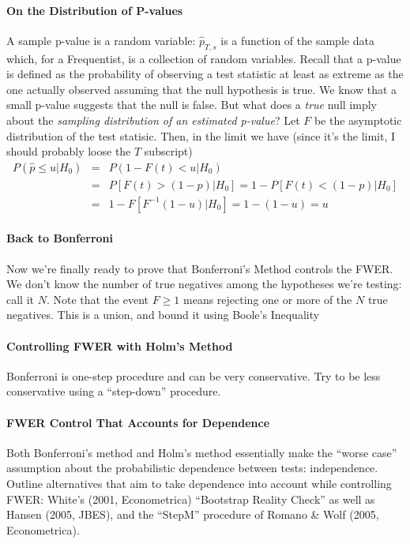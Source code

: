 \paragraph{On the Distribution of P-values}
A sample p-value is a random variable: $\widehat{p}_{T,s}$ is a function of the sample data which, for a Frequentist, is a collection of random variables.
Recall that a p-value is defined as the probability of observing a test statistic at least as extreme as the one actually observed assuming that the null hypothesis is true.
We know that a small p-value suggests that the null is false.
But what does a \emph{true} null imply about the \emph{sampling distribution of an estimated p-value}?
Let $F$ be the asymptotic distribution of the test statisic.
Then, in the limit we have (since it's the limit, I should probably loose the $T$ subscript)
\begin{eqnarray*}
  P(\widehat{p}\leq u|H_0) &=&  P(1- F(t)<u|H_0) \\
  &=& P\left[ F(t) > \left( 1-p \right)|H_0  \right] = 1 - P\left[ F(t) < (1-p) |H_0 \right]\\
  &=& 1 - F\left[ F^{-1}(1-u)|H_0\right] = 1 - (1-u) = u
\end{eqnarray*}

\paragraph{Back to Bonferroni}
Now we're finally ready to prove that Bonferroni's Method controls the FWER.
We don't know the number of true negatives among the hypotheses we're testing: call it $N$.
Note that the event $F\geq 1$ means rejecting one or more of the $N$ true negatives.
This is a union, and bound it using Boole's Inequality 

\paragraph{Controlling FWER with Holm's Method}
Bonferroni is one-step procedure and can be very conservative.
Try to be less conservative using a ``step-down'' procedure.

\paragraph{FWER Control That Accounts for Dependence} Both Bonferroni's method and Holm's method essentially make the ``worse case'' assumption about the probabilistic dependence between tests: independence.
Outline alternatives that aim to take dependence into account while controlling FWER: White's (2001, Econometrica) ``Bootstrap Reality Check'' as well as Hansen (2005, JBES), and the ``StepM'' procedure of Romano \& Wolf (2005, Econometrica).

